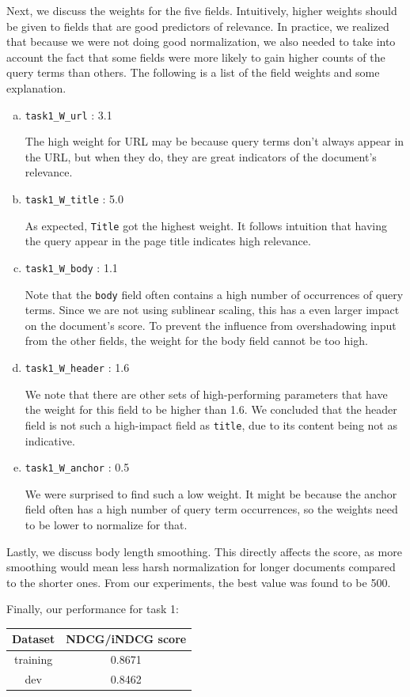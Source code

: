 \documentclass[10pt,twocolumn]{article}
\begin{document}
Next, we discuss the weights for the five fields. Intuitively, higher weights should be given to fields that are good predictors of relevance. In practice, we realized that because we were not doing good normalization, we also needed to take into account the fact that some fields were more likely to gain higher counts of the query terms than others. The following is a list of the field weights and some explanation.
\begin{enumerate}[(a)]
\item \texttt{task1\_W\_url} : 3.1

The high weight for URL may be because query terms don't always appear in the URL, but when they do, they are great indicators of the document's relevance.
\item \texttt{task1\_W\_title} : 5.0

As expected, \texttt{Title} got the highest weight. It follows intuition that having the query appear in the page title indicates high relevance. 
\item \texttt{task1\_W\_body} : 1.1

Note that the \texttt{body} field often contains a high number of occurrences of query terms. Since we are not using sublinear scaling, this has a even larger impact on the document's score. To prevent the influence from overshadowing input from the other fields, the weight for the body field cannot be too high.
\item \texttt{task1\_W\_header} : 1.6

We note that there are other sets of high-performing parameters that have the weight for this field to be higher than 1.6. We concluded that the header field is not such a high-impact field as \texttt{title}, due to its content being not as indicative.
\item \texttt{task1\_W\_anchor} : 0.5

We were surprised to find such a low weight. It might be because the anchor field often has a high number of query term occurrences, so the weights need to be lower to normalize for that.
\end{enumerate}

Lastly, we discuss body length smoothing. This directly affects the score, as more smoothing would mean less harsh normalization for longer documents compared to the shorter ones. From our experiments, the best value was found to be 500.

Finally, our performance for task 1:
\begin{table}[H]
\centering
\begin{tabular}{|c|c|}
\hline
Dataset & NDCG/iNDCG score \\\hline
training & 0.8671\\\hline
dev & 0.8462\\\hline
\end{tabular}
\end{table}
\end{document}
